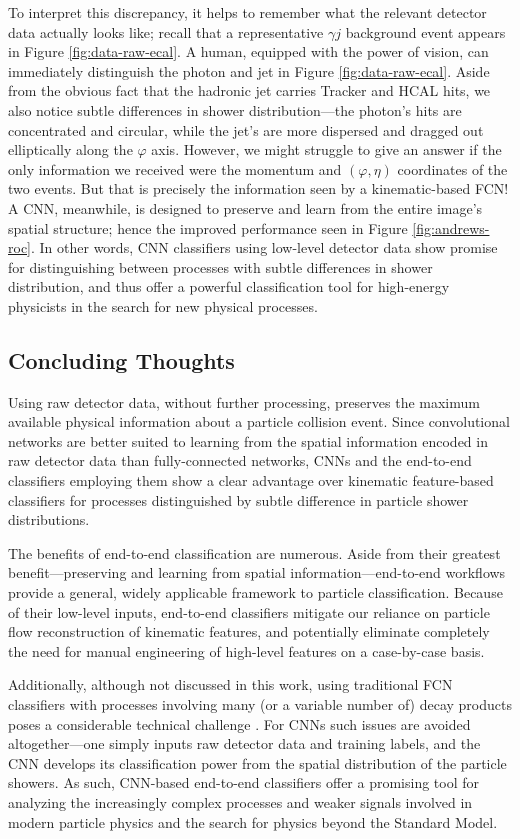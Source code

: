 \documentclass[11pt, a4paper]{article}
\begin{document}
To interpret this discrepancy, it helps to remember what the relevant detector data actually looks like; recall that a representative $ \gamma j $ background event appears in Figure \ref{fig:data-raw-ecal}. A human, equipped with the power of vision, can immediately distinguish the photon and jet in Figure \ref{fig:data-raw-ecal}. Aside from the obvious fact that the hadronic jet carries Tracker and HCAL hits, we also notice subtle differences in shower distribution---the photon's hits are concentrated and circular, while the jet's are more dispersed and dragged out elliptically along the $ \varphi $ axis. However, we might struggle to give an answer if the only information we received were the momentum and $ (\varphi, \eta) $ coordinates of the two events. But that is precisely the information seen by a kinematic-based FCN! A CNN, meanwhile, is designed to preserve and learn from the entire image's spatial structure; hence the improved performance seen in Figure \ref{fig:andrews-roc}. In other words, CNN classifiers using low-level detector data show promise for distinguishing between processes with subtle differences in shower distribution, and thus offer a powerful classification tool for high-energy physicists in the search for new physical processes.

\subsection{Concluding Thoughts}
Using raw detector data, without further processing, preserves the maximum available physical information about a particle collision event. Since convolutional networks are better suited to learning from the spatial information encoded in raw detector data than fully-connected networks, CNNs and the end-to-end classifiers employing them show a clear advantage over kinematic feature-based classifiers for processes distinguished by subtle difference in particle shower distributions. 

The benefits of end-to-end classification are numerous. Aside from their greatest benefit---preserving and learning from spatial information---end-to-end workflows provide a general, widely applicable framework to particle classification. Because of their low-level inputs, end-to-end classifiers mitigate our reliance on particle flow reconstruction of kinematic features, and potentially eliminate completely the need for manual engineering of high-level features on a case-by-case basis. 

Additionally, although not discussed in this work, using traditional FCN classifiers with processes involving many (or a variable number of) decay products poses a considerable technical challenge \cite{andrews-higgs}. For CNNs such issues are avoided altogether---one simply inputs raw detector data and training labels, and the CNN develops its classification power from the spatial distribution of the particle showers. As such, CNN-based end-to-end classifiers offer a promising tool for analyzing the increasingly complex processes and weaker signals involved in modern particle physics and the search for physics beyond the Standard Model.
\end{document}
